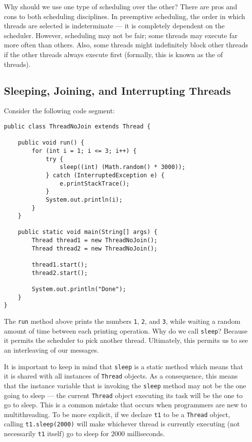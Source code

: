 Why should we use one type of scheduling over the other? There are pros and cons to both scheduling disciplines. In preemptive scheduling, the order in which threads are selected is indeterminate --- it is completely dependent on the scheduler. However, scheduling may not be fair; some threads may execute far more often than others. Also, some threads might indefinitely block other threads if the other threads always execute first (formally, this is known as the  of threads).


\subsection{Sleeping, Joining, and Interrupting Threads}

Consider the following code segment:

\begin{lstlisting}
public class ThreadNoJoin extends Thread {

	public void run() {
		for (int i = 1; i <= 3; i++) {
			try {
				sleep((int) (Math.random() * 3000));
			} catch (InterruptedException e) {
				e.printStackTrace();
			}
			System.out.println(i);
		}
	}

	public static void main(String[] args) {
		Thread thread1 = new ThreadNoJoin();
		Thread thread2 = new ThreadNoJoin();

		thread1.start();
		thread2.start();

		System.out.println("Done");
	}
}
\end{lstlisting}

The \verb!run! method above prints the numbers \verb!1!, \verb!2!, and \verb!3!, while waiting a random amount of time between each printing operation. Why do we call \verb!sleep!? Because it permits the scheduler to pick another thread. Ultimately, this permits us to see an interleaving of our messages. 

It is important to keep in mind that \verb!sleep! is a static method which means that it is shared with all instances of \verb!Thread! objects. As a consequence, this means that the instance variable that is invoking the \verb!sleep! method may not be the one going to sleep --- the current \verb!Thread! object executing its task will be the one to go to sleep. This is a common mistake that occurs when programmers are new to multithreading. To be more explicit, if we declare \verb!t1! to be a \verb!Thread! object, calling \verb!t1.sleep(2000)! will make whichever thread is currently executing (not necessarily \verb!t1! itself) go to sleep for $2000$ milliseconds. 


